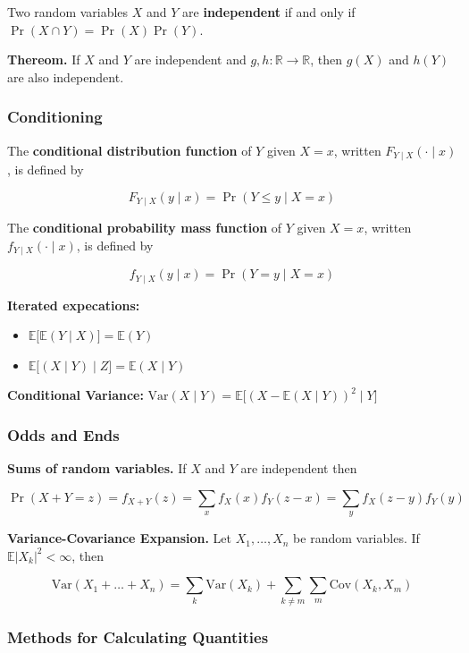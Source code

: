 \documentclass{article}
\newcommand{\E}{\mathbb{E}}
\newcommand{\Var}{\mathrm{Var}}
\newcommand{\Cov}{\mathrm{Cov}}
\begin{document}
Two random variables \(X\) and \(Y\) are \textbf{independent} if and only if \(\Pr(X \cap Y) = \Pr(X) \Pr(Y)\).

\textbf{Thereom.} If \(X\) and \(Y\) are independent and \(g, h: \mathbb{R} \to \mathbb{R}\), then \(g(X)\) and \(h(Y)\) are also independent.

\subsubsection{Conditioning}

The \textbf{conditional distribution function} of \(Y\) given \(X = x\), written \(F_{Y\mid X}( \cdot \mid x)\), is defined by

\[
F_{Y\mid X}( y \mid x) = \Pr(Y \leq y \mid X = x)
\]

The \textbf{conditional probability mass function} of \(Y\) given \(X = x\), written \(f_{Y\mid X}( \cdot \mid x)\), is defined by

\[
f_{Y\mid X}( y \mid x) = \Pr(Y = y \mid X = x)
\]

\textbf{Iterated expecations:} 

\begin{itemize}

\item \(\E\big[ \E(Y \mid X) \big] = \E(Y)\)

\item \(\E \big[ (X \mid Y) \mid Z \big] = \E(X \mid Y)\)

\end{itemize}

\textbf{Conditional Variance:} \(\Var(X \mid Y) = \E\big[ (X - \E(X \mid Y))^2   \mid Y\big]\)

\subsubsection{Odds and Ends}

\textbf{Sums of random variables.} If \(X\) and \(Y\) are independent then

\[
\Pr(X + Y = z) = f_{X +Y}(z) = \sum_x f_X(x) f_Y(z-x) = \sum_y f_X(z - y) f_Y(y)
\]

\textbf{Variance-Covariance Expansion.} Let \(X_1, \ldots, X_n\) be random variables. If \(\E \left|X_k \right|^2 < \infty\), then 

\[
\Var(X_1 + \ldots + X_n) = \sum_k \Var(X_k) + \sum_{k \neq m} \sum_m \Cov(X_k, X_m)
\]

\subsubsection{Methods for Calculating Quantities}
\end{document}
